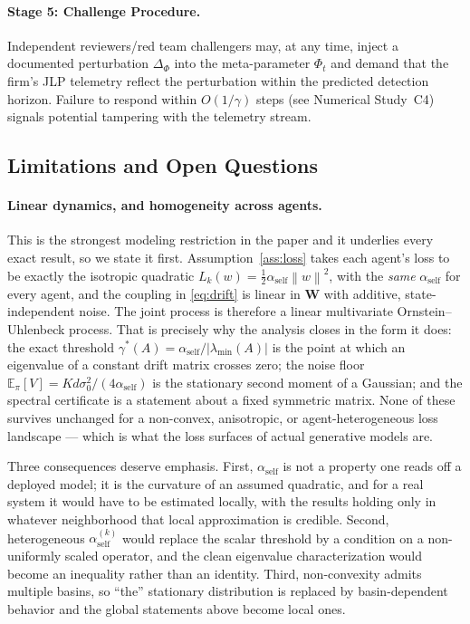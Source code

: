 \documentclass[12pt]{article}
\theoremstyle{plain}
\theoremstyle{definition}
\newcommand{\E}{\mathbb{E}}
\newcommand{\W}{\mathbf{W}}
\newcommand{\norm}[1]{\left\lVert #1 \right\rVert}
\newcommand{\abs}[1]{\left| #1 \right|}
\newcommand{\loss}{L}
\begin{document}
\paragraph{Stage 5: Challenge Procedure.}
Independent reviewers/red team challengers may, at any time, inject a documented perturbation
$\Delta_\Phi$ into the meta-parameter $\Phi_t$ and demand that the
firm's JLP telemetry reflect the perturbation within the predicted
detection horizon.  Failure to respond within $O(1/\gamma)$ steps
(see Numerical Study~C4) signals potential tampering with the
telemetry stream.

\subsection{Limitations and Open Questions}
\label{sec:limitations}

\paragraph{Linear dynamics, and homogeneity across agents.}
This is the strongest modeling restriction in the paper and it underlies every exact result, so we
state it first. Assumption~\ref{ass:loss} takes each agent's loss to be exactly the isotropic
quadratic $\loss_k(w)=\tfrac12\alpha_{\mathrm{self}}\norm{w}^2$, with the \emph{same}
$\alpha_{\mathrm{self}}$ for every agent, and the coupling in \eqref{eq:drift} is linear in $\W$
with additive, state-independent noise. The joint process is therefore a linear multivariate
Ornstein--Uhlenbeck process. That is precisely why the analysis closes in the form it does: the exact
threshold $\gamma^*(A)=\alpha_{\mathrm{self}}/\abs{\lambda_{\min}(A)}$ is the point at which an
eigenvalue of a constant drift matrix crosses zero; the noise floor
$\E_\pi[V]=Kd\sigma_0^2/(4\alpha_{\mathrm{self}})$ is the stationary second moment of a Gaussian; and
the spectral certificate is a statement about a fixed symmetric matrix. None of these survives
unchanged for a non-convex, anisotropic, or agent-heterogeneous loss landscape --- which is what the
loss surfaces of actual generative models are.

Three consequences deserve emphasis. First, $\alpha_{\mathrm{self}}$ is not a property one reads off
a deployed model; it is the curvature of an assumed quadratic, and for a real system it would have to
be estimated locally, with the results holding only in whatever neighborhood that local
approximation is credible. Second, heterogeneous $\alpha_{\mathrm{self}}^{(k)}$ would replace the
scalar threshold by a condition on a non-uniformly scaled operator, and the clean eigenvalue
characterization would become an inequality rather than an identity. Third, non-convexity admits
multiple basins, so ``the'' stationary distribution is replaced by basin-dependent behavior and the
global statements above become local ones.
\end{document}
